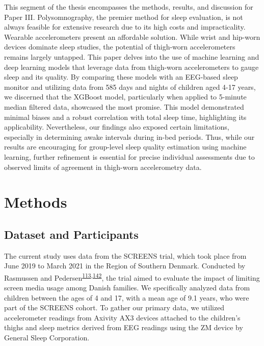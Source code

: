 \documentclass[
  10pt,
]{scrbook}
\begin{document}
This segment of the thesis encompasses the methods, results, and
discussion for Paper III. Polysomnography, the premier method for sleep
evaluation, is not always feasible for extensive research due to its
high costs and impracticality. Wearable accelerometers present an
affordable solution. While wrist and hip-worn devices dominate sleep
studies, the potential of thigh-worn accelerometers remains largely
untapped. This paper delves into the use of machine learning and deep
learning models that leverage data from thigh-worn accelerometers to
gauge sleep and its quality. By comparing these models with an EEG-based
sleep monitor and utilizing data from 585 days and nights of children
aged 4-17 years, we discerned that the XGBoost model, particularly when
applied to 5-minute median filtered data, showcased the most promise.
This model demonstrated minimal biases and a robust correlation with
total sleep time, highlighting its applicability. Nevertheless, our
findings also exposed certain limitations, especially in determining
awake intervals during in-bed periods. Thus, while our results are
encouraging for group-level sleep quality estimation using machine
learning, further refinement is essential for precise individual
assessments due to observed limits of agreement in thigh-worn
accelerometry data.

\hypertarget{methods-2}{%
\section{Methods}\label{methods-2}}

\hypertarget{dataset-and-participants}{%
\subsection{Dataset and Participants}\label{dataset-and-participants}}

The current study uses data from the SCREENS trial, which took place
from June 2019 to March 2021 in the Region of Southern Denmark.
Conducted by Rasmussen and
Pedersen\textsuperscript{\protect\hyperlink{ref-rasmussen_short-term_2020}{113},\protect\hyperlink{ref-pedersen_effects_2022}{142}},
the trial aimed to evaluate the impact of limiting screen media usage
among Danish families. We specifically analyzed data from children
between the ages of 4 and 17, with a mean age of 9.1 years, who were
part of the SCREENS cohort. To gather our primary data, we utilized
accelerometer readings from Axivity AX3 devices attached to the
children's thighs and sleep metrics derived from EEG readings using the
ZM device by General Sleep Corporation.
\end{document}
